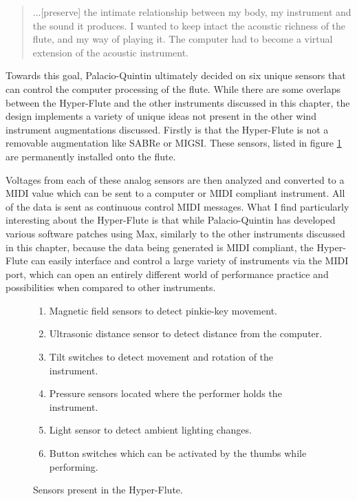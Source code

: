 \begin{quote}
    ...[preserve] the intimate relationship between my body, my instrument and the sound it produces. I wanted to keep intact the acoustic richness of the flute, and my way of playing it. The computer had to become a virtual extension of the acoustic instrument. \cite{hyper-flute2003}
\end{quote}

Towards this goal, Palacio-Quintin ultimately decided on six unique sensors that can control the computer processing of the flute. While there are some overlaps between the Hyper-Flute and the other instruments discussed in this chapter, the design implements a variety of unique ideas not present in the other wind instrument augmentations discussed. Firstly is that the Hyper-Flute is not a removable augmentation like SABRe or MIGSI. These sensors, listed in figure \ref{fig:hyper-flute-sensors} are permanently installed onto the flute. 


Voltages from each of these analog sensors are then analyzed and converted to a MIDI value which can be sent to a computer or MIDI compliant instrument. All of the data is sent as  continuous control MIDI messages. What I find particularly interesting about the Hyper-Flute is that while Palacio-Quintin has developed various software patches using Max, similarly to the other instruments discussed in this chapter, because the data being generated is MIDI compliant, the Hyper-Flute can easily interface and control a large variety of instruments via the MIDI port, which can open an entirely different world of performance practice and possibilities when compared to other instruments.\cite{hyper-flute2003}

\begin{figure}
    \centering
    \begin{enumerate}
        \item Magnetic field sensors to detect pinkie-key movement.
        \item Ultrasonic distance sensor to detect distance from the computer.
        \item Tilt switches to detect movement and rotation of the instrument.
        \item Pressure sensors located where the performer holds the instrument.
        \item Light sensor to detect ambient lighting changes.
        \item Button switches which can be activated by the thumbs while performing.
    \end{enumerate}
    \caption{Sensors present in the Hyper-Flute.}
    \label{fig:hyper-flute-sensors}
\end{figure}

